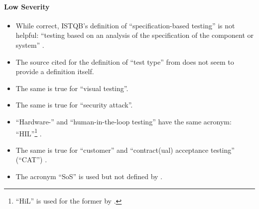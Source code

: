    \paragraph{Low Severity}
    \begin{itemize}
        \item While correct, ISTQB's definition of ``specification-based testing''
              is not helpful: ``testing based on an analysis of the specification
              of the component or system'' \citepISTQB{}.
        \item The source cited for the definition of ``test type'' from
              \citepISTQB{} does not seem to provide a definition itself.
        \item The same is true for ``visual testing''.
        \item The same is true for ``security attack''.
        \item ``Hardware-'' and ``human-in-the-loop testing'' have the same
              acronym: ``HIL''\footnote{``HiL'' is used for the former by
                  \citet[p.~2]{PreußeEtAl2012}.} \citep[p.~23]{Firesmith2015}.
        \item The same is true for ``customer'' and ``contract(ual) acceptance
              testing'' (``CAT'') \citep[p.~30]{Firesmith2015}.
        \item The acronym ``SoS'' is used but not defined by
              \citet[p.~23]{Firesmith2015}.
    \end{itemize}\fi